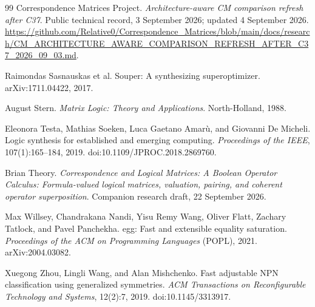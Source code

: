 \documentclass[10pt]{article}
\theoremstyle{plain}
\theoremstyle{definition}
\theoremstyle{remark}
\begin{document}
\begin{thebibliography}{99}
Correspondence Matrices Project.
\newblock \emph{Architecture-aware CM comparison refresh after C37}.
\newblock Public technical record, 3 September 2026; updated 4 September 2026.
\newblock \url{https://github.com/Relative0/Correspondence_Matrices/blob/main/docs/research/CM_ARCHITECTURE_AWARE_COMPARISON_REFRESH_AFTER_C37_2026_09_03.md}.

Raimondas Sasnauskas et al.
\newblock Souper: A synthesizing superoptimizer.
\newblock arXiv:1711.04422, 2017.

August Stern.
\newblock \emph{Matrix Logic: Theory and Applications}.
\newblock North-Holland, 1988.

Eleonora Testa, Mathias Soeken, Luca Gaetano Amar\`u, and Giovanni De Micheli.
\newblock Logic synthesis for established and emerging computing.
\newblock \emph{Proceedings of the IEEE}, 107(1):165--184, 2019.
\newblock doi:10.1109/JPROC.2018.2869760.

Brian Theory.
\newblock \emph{Correspondence and Logical Matrices: A Boolean Operator Calculus: Formula-valued logical matrices, valuation, pairing, and coherent operator superposition}.
\newblock Companion research draft, 22 September 2026.

Max Willsey, Chandrakana Nandi, Yisu Remy Wang, Oliver Flatt, Zachary Tatlock, and Pavel Panchekha.
\newblock egg: Fast and extensible equality saturation.
\newblock \emph{Proceedings of the ACM on Programming Languages} (POPL), 2021.
\newblock arXiv:2004.03082.

Xuegong Zhou, Lingli Wang, and Alan Mishchenko.
\newblock Fast adjustable NPN classification using generalized symmetries.
\newblock \emph{ACM Transactions on Reconfigurable Technology and Systems}, 12(2):7, 2019.
\newblock doi:10.1145/3313917.

\end{thebibliography}
\end{document}

